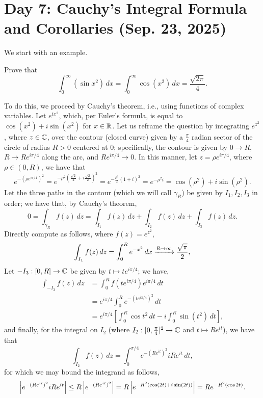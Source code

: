 \section{Day 7: Cauchy's Integral Formula and Corollaries (Sep. 23, 2025)}
We start with an example.
\begin{example}
    Prove that
    \[ \int_0^\infty (\sin x^2) \, dx = \int_0^\infty \cos(x^2) \, dx = \frac{\sqrt{2\pi}}{4}. \]
\end{example}
\begin{solution}
    To do this, we proceed by Cauchy's theorem, i.e., using functions of complex variables. Let $e^{ix^2}$, which, per Euler's formula, is equal to $\cos(x^2) + i \sin(x^2)$ for $x \in \mathbb R$. Let us reframe the question by integrating $e^{z^2}$, where $z \in \mathbb C$, over the contour (closed curve) given by a $\frac{\pi}{4}$ radian sector of the circle of radius $R > 0$ centered at $0$; specifically, the contour is given by $0 \to R$, $R \to R e^{i \pi/4}$ along the arc, and $R e^{i \pi/4} \to 0$. In this manner, let $z = \rho e^{i \pi/4}$, where $\rho \in (0, R)$, we have that
    \[ e^{-(\rho e^{i \pi/4})^2} = e^{-\rho^2 \left(\frac{\sqrt{2}}{2} + i \frac{\sqrt{2}}{2}\right)^2} = e^{-\frac{\rho^2}{2} (1 + i)^2} = e^{-\rho^2 i} = \cos(\rho^2) + i \sin(\rho^2). \]
    Let the three paths in the contour (which we will call $\gamma_R$) be given by $I_1, I_2, I_3$ in order; we have that, by Cauchy's theorem,
    \[ 0 = \int_{\gamma_R} f(z) \, dz = \int_{I_1} f(z) \, dz + \int_{I_2} f(z) \, dz + \int_{I_3} f(z) \, dz. \]
    Directly compute as follows, where $f(z) = e^{z^2}$,
    \[ \int_{I_1} f(z) \, dz = \int_0^R e^{-x^2} \, dx \xrightarrow{R \to \infty} \frac{\sqrt{\pi}}{2}, \]
    Let $-I_3 : [0, R] \to \mathbb C$ be given by $t \mapsto t e^{i\pi/4}$; we have,
    \begin{align*}
        \int_{-I_3} f(z) \, dz &= \int_0^R f\left(te^{i \pi/4}\right) e^{i\pi/4} \, dt \\
        &= e^{i\pi/4} \int_0^R e^{-(te^{i\pi/4})^2} \, dt \\
        &= e^{i\pi/4} \left[\int_0^R \cos t^2 \, dt - i \int_0^R \sin(t^2) \, dt \right],
    \end{align*}
    and finally, for the integral on $I_2$ (where $I_2 : [0, \frac{\pi}{4}]^2 \to \mathbb C$ and $t \mapsto Re^{it}$), we have that
    \[ \int_{I_2} f(z) \, dz = \int_0^{\pi/4} e^{-(Re^{it})^2} i Re^{it} \, dt, \]
    for which we may bound the integrand as follows,
    \[ \left\lvert e^{-(Re^{it})^2} i Re^{it} \right\rvert \leq R \left\lvert e^{-(Re^{it})^2} \right\rvert = R \left\lvert e^{-R^2(\cos (2t) + i \sin(2t))} \right\rvert = Re^{-R^2(\cos 2t)}. \]

\end{solution}

